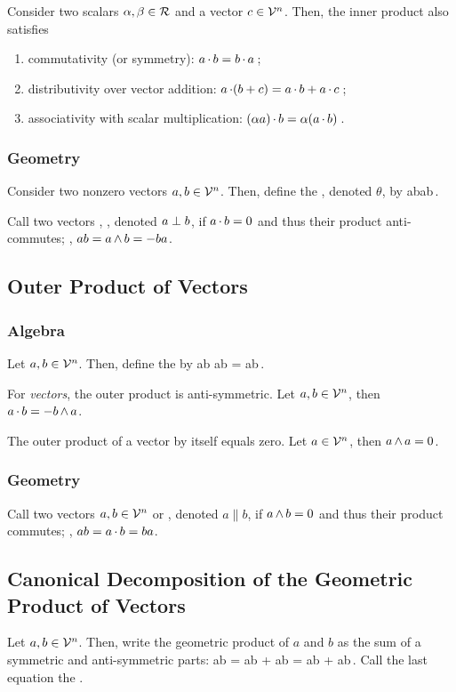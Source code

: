 Consider two scalars $\alpha, \beta\in\mathcal{R}$ and a vector $c\in\mathcal{V}^{n}$. Then, the inner product also satisfies
\begin{enumerate}
\item commutativity (or symmetry): $a\operatorname{\cdot} b = b\operatorname{\cdot} a$\,;
\item distributivity over vector addition: $a\operatorname{\cdot}(b + c) = a\operatorname{\cdot} b + a\operatorname{\cdot} c$\,;
\item associativity with scalar multiplication: $(\alpha a)\operatorname{\cdot} b = \alpha(a\operatorname{\cdot} b)$\,.
\end{enumerate}


\subsubsection{Geometry}
Consider two nonzero vectors $a,b\in\mathcal{V}^{n}$. Then, define the , denoted $\theta$, by
\beq
\magn a\magn b\cos\theta {} a\iprod b\,.
\eeq

Call two vectors , \aka {}, denoted $a\perp b$, if $a\operatorname{\cdot} b = 0$ and thus their product anti-commutes; \ie, $ab = a\operatorname{\wedge} b = -ba$.


\subsection{Outer Product of Vectors}

\subsubsection{Algebra}
Let $a, b\in\mathcal{V}^{n}$. Then, define the  by
\beq
a\oprod b  \com ab = \xcom ab\,.
\eeq

For \emph{vectors}, the outer product is anti-symmetric. Let $a,b\in\mathcal{V}^{n}$, then $a\operatorname{\cdot} b = -b\operatorname{\wedge} a$.

The outer product of a vector by itself equals zero. Let $a\in\mathcal{V}^{n}$, then $a\operatorname{\wedge} a = 0$.


\subsubsection{Geometry}
Call two vectors $a,b\in\mathcal{V}^{n}$  or , denoted $a\parallel b$, if $a\operatorname{\wedge} b = 0$ and thus their product commutes; \ie, $ab = a\operatorname{\cdot} b = ba$.


\subsection{Canonical Decomposition of the Geometric Product of Vectors}
Let $a, b\in\mathcal{V}^{n}$. Then, write the geometric product of $a$ and $b$ as the sum of a symmetric and anti-symmetric parts:
\beq
ab = \acom ab + \com ab = a\iprod b + a\oprod b\,.
\eeq
Call the last equation the .


